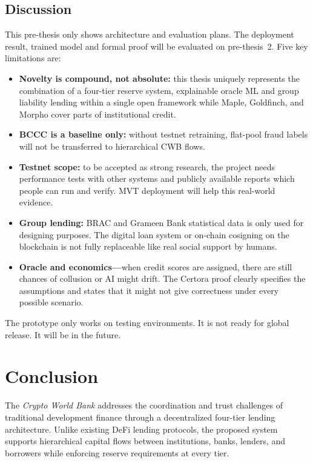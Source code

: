 \documentclass[12pt, a4paper]{report}
\begin{document}
\section{Discussion}
\label{sec:ch5-discussion}
\label{sec:research-limitations}
\label{sec:bangladesh-reg}

This pre-thesis only shows architecture and evaluation plans. The deployment result, trained model and formal proof will be evaluated on pre-thesis~2. Five key limitations are:

\begin{itemize}[noitemsep]
\item \textbf{Novelty is compound, not absolute:} this thesis uniquely represents the combination of a four-tier reserve system, explainable oracle ML and group liability lending within a single open framework while Maple, Goldfinch, and Morpho cover parts of institutional credit.
\item \textbf{BCCC is a baseline only:} without testnet retraining, flat-pool fraud labels will not be transferred to hierarchical CWB flows.
\item \textbf{Testnet scope:} to be accepted as strong research, the project needs performance tests with other systems and publicly available reports which people can run and verify. MVT deployment will help this real-world evidence.
\item \textbf{Group lending:} BRAC and Grameen Bank statistical data is only used for designing purposes. The digital loan system or on-chain cosigning on the blockchain is not fully replaceable like real social support by humans.
\item \textbf{Oracle and economics---}when credit scores are assigned, there are still chances of collusion or AI might drift. The Certora proof clearly specifies the assumptions and states that it might not give correctness under every possible scenario.
\end{itemize}

The prototype only works on testing environments. It is not ready for global release. It will be in the future.

\chapter{Conclusion}

The \textit{Crypto World Bank} addresses the coordination and trust challenges of traditional development finance through a decentralized four-tier lending architecture. Unlike existing DeFi lending protocols, the proposed system supports hierarchical capital flows between institutions, banks, lenders, and borrowers while enforcing reserve requirements at every tier.
\end{document}

